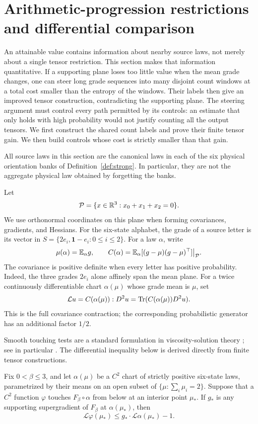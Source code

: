 \section{Arithmetic-progression restrictions and differential comparison}
\label{ap:section}

An attainable value contains information about nearby source laws, not merely
about a single tensor restriction.  This section makes that information
quantitative.  If a supporting plane loses too little value when the mean
grade changes, one can steer long grade sequences into many disjoint count
windows at a total cost smaller than the entropy of the windows.  Their
labels then give an improved tensor construction, contradicting the supporting
plane.  The steering argument must control every path permitted by its controls:
an estimate that only holds with high probability would not justify counting
all the output tensors.  We first construct the shared count labels and
prove their finite tensor gain.  We then build controls whose cost is
strictly smaller than that gain.

All source laws in this section are the canonical laws in each of the six
physical orientation banks of Definition~\ref{def:strong}.  In particular,
they are not the aggregate physical law obtained by forgetting the banks.

Let
\[
 \mathcal P=\{x\in\mathbb R^3:x_0+x_1+x_2=0\}.
\]
We use orthonormal coordinates on this plane when forming covariances,
gradients, and Hessians.  For the six-state alphabet, the grade of a source
letter is its vector in
\(S=\{2e_i,\boldsymbol 1-e_i:0\leq i\leq2\}\).
For a law \(\alpha\), write
\[
 \mu(\alpha)=\mathbb E_\alpha g,
 \qquad
 C(\alpha)=\mathbb E_\alpha[(g-\mu)(g-\mu)^\top]\big|_{\mathcal P}.
\]
The covariance is positive definite when every letter has positive
probability.  Indeed, the three grades \(2e_i\) alone affinely span the mean
plane.  For a twice continuously differentiable chart \(\alpha(\mu)\)
whose grade mean is \(\mu\), set
\[
 \mathcal L u=C(\alpha(\mu)):D^2u
              =\operatorname{Tr}(C(\alpha(\mu))D^2u).
\]
This is the full covariance contraction; the corresponding probabilistic
generator has an additional factor \(1/2\).

Smooth touching tests are a standard formulation in viscosity-solution
theory \cite{crandalllions1983}; see in particular
\cite[Section~2]{crandallishiilions1992}.  The differential inequality
below is derived directly from finite tensor constructions.

\begin{theorem}\label{thm:ap}
Fix \(0<\beta\leq3\), and let \(\alpha(\mu)\) be a \(C^2\) chart of
strictly positive six-state laws, parametrized by their means on an open
subset of \(\{\mu:\sum_i\mu_i=2\}\).  Suppose that a \(C^2\) function
\(\varphi\) touches \(F_\beta\circ\alpha\) from below at an interior
point \(\mu_*\).  If \(g_*\) is any supporting supergradient of
\(F_\beta\) at \(\alpha(\mu_*)\), then
\begin{equation}\label{ap:lower-test}
 \mathcal L\varphi(\mu_*)
 \leq g_*\cdot\mathcal L\alpha(\mu_*)-1.
\end{equation}
\end{theorem}

